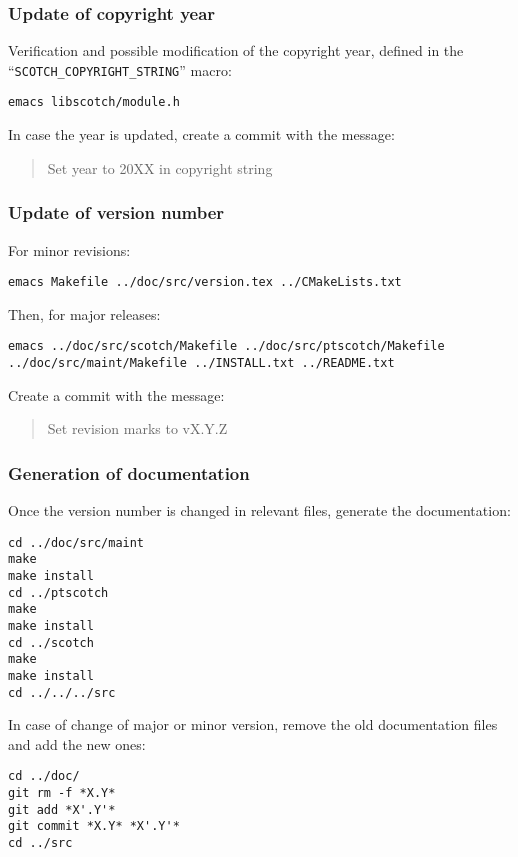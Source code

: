 \subsubsection{Update of copyright year}

Verification and possible modification of the copyright year, defined
in the ``\texttt{SCOTCH\_\lbt COPYRIGHT\_\lbt STRING}'' macro:

\begin{lstlisting}
emacs libscotch/module.h
\end{lstlisting}

\noi
In case the year is updated, create a commit with the message:
\begin{quote}
Set year to 20XX in copyright string
\end{quote}

\subsubsection{Update of version number}

For minor revisions:
\begin{lstlisting}
emacs Makefile ../doc/src/version.tex ../CMakeLists.txt
\end{lstlisting}

\noi
Then, for major releases:
\begin{lstlisting}
emacs ../doc/src/scotch/Makefile ../doc/src/ptscotch/Makefile ../doc/src/maint/Makefile ../INSTALL.txt ../README.txt
\end{lstlisting}

\noi
Create a commit with the message:
\begin{quote}
Set revision marks to vX.Y.Z
\end{quote}

\subsubsection{Generation of documentation}

Once the version number is changed in relevant files, generate the
documentation:
\begin{lstlisting}
cd ../doc/src/maint
make
make install
cd ../ptscotch
make
make install
cd ../scotch
make
make install
cd ../../../src
\end{lstlisting}

\noi
In case of change of major or minor version, remove the old
documentation files and add the new ones:
\begin{lstlisting}
cd ../doc/
git rm -f *X.Y*
git add *X'.Y'*
git commit *X.Y* *X'.Y'*
cd ../src
\end{lstlisting}

